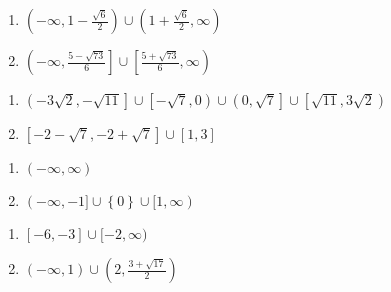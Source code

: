 \begin{multicols}{2}
\begin{enumerate}
\setcounter{enumi}{\value{HW}}


\item  $\left(-\infty, 1-\frac{\sqrt{6}}{2} \right) \cup \left(1+\frac{\sqrt{6}}{2}, \infty \right)$

\item  $\left(-\infty, \frac{5 - \sqrt{73}}{6} \right] \cup \left[\frac{5 + \sqrt{73}}{6}, \infty \right)$


\setcounter{HW}{\value{enumi}}
\end{enumerate}
\end{multicols}

\begin{multicols}{2}
\begin{enumerate}
\setcounter{enumi}{\value{HW}}

\item {\scriptsize $\left(-3\sqrt{2}, -\sqrt{11} \right] \cup \left[-\sqrt{7}, 0 \right) \cup \left(0, \sqrt{7} \right] \cup \left[\sqrt{11}, 3\sqrt{2} \right)$}
\item $\left[-2-\sqrt{7}, -2+\sqrt{7} \right] \cup [1, 3]$


\setcounter{HW}{\value{enumi}}
\end{enumerate}
\end{multicols}



\begin{multicols}{2}
\begin{enumerate}
\setcounter{enumi}{\value{HW}}

\item $(-\infty, \infty)$
\item  $(-\infty, -1] \cup \left\{ 0 \right\} \cup [1,\infty)$

\setcounter{HW}{\value{enumi}}
\end{enumerate}
\end{multicols}


\begin{multicols}{2}
\begin{enumerate}
\setcounter{enumi}{\value{HW}}


\item  $[-6,-3] \cup [-2, \infty)$

\item  $(-\infty, 1) \cup \left(2, \frac{3+\sqrt{17}}{2}\right)$


\setcounter{HW}{\value{enumi}}
\end{enumerate}
\end{multicols}

